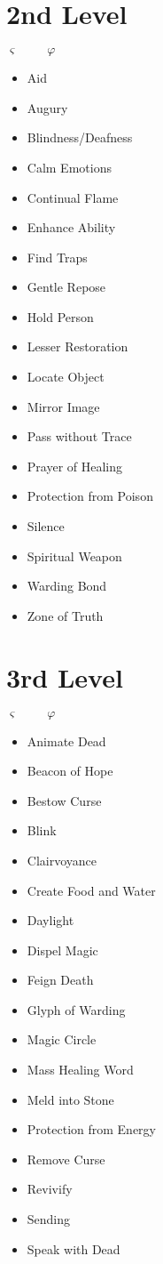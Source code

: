 \documentclass[10pt,twoside,twocolumn,openany]{book}
\newcommand{\tikzcircle}[2][black,fill=white]{\tikz[baseline=-0.5ex]\draw[#1,radius=#2] (0,0) circle ;}%
\begin{document}
\section{2nd Level}
$\varsigma\hspace{1cm}\varphi\hspace{1cm}$
\begin{itemize}
	\item Aid
	\item Augury 
	\item Blindness/Deafness 
	\item Calm Emotions 
	\item Continual Flame 
	\item Enhance Ability
	\item Find Traps
	\item Gentle Repose
	\item Hold Person
	\item Lesser Restoration 
	\item Locate Object
	\item[{\tikzcircle[fill=lightgray]{4pt}}] Mirror Image
	\item[{\tikzcircle[fill=lightgray]{4pt}}] Pass without Trace
	\item Prayer of Healing 
	\item Protection from Poison 
	\item Silence
	\item Spiritual Weapon 
	\item Warding Bond
	\item Zone of Truth
\end{itemize}
\section{3rd Level}
$\varsigma\hspace{1cm}\varphi\hspace{1cm}$
\begin{itemize}
	\item Animate Dead 
	\item Beacon of Hope 
	\item Bestow Curse 
	\item[{\tikzcircle[fill=lightgray]{4pt}}] Blink
	\item Clairvoyance
	\item Create Food and Water 
	\item Daylight
	\item[{\tikzcircle[fill=lightgray]{4pt}}] Dispel Magic
	\item Feign Death
	\item Glyph of Warding 
	\item Magic Circle
	\item Mass Healing Word 
	\item Meld into Stone 
	\item Protection from Energy 
	\item Remove Curse
	\item Revivify
	\item Sending
	\item Speak with Dead
\end{itemize}
\end{document}

